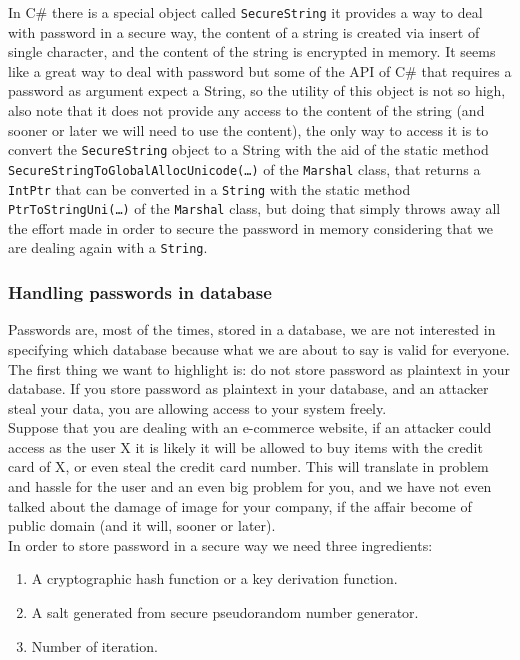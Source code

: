 In C\# there is a special object called \texttt{SecureString} it provides a way to deal with password in a secure way, the content of a string is created via insert of single character, and the content of the string is encrypted in memory.\newline
It seems like a great way to deal with password but some of the API of C\# that requires a password as argument expect a String, so the utility of this object is not so high, also note that it does not provide any access to the content of the string (and sooner or later we will need to use the content), the only way to access it is to convert the \texttt{SecureString} object to a String with the aid of the static method \texttt{SecureStringToGlobalAllocUnicode(…)} of the \texttt{Marshal} class, that returns a \texttt{IntPtr} that can be converted in a \texttt{String} with the static method \texttt{PtrToStringUni(…)} of the \texttt{Marshal} class, but doing that simply throws away all the effort made in order to secure the password in memory considering that we are dealing again with a \texttt{String}.\newline

\subsubsection{Handling passwords in database}
Passwords are, most of the times, stored in a database, we are not interested in specifying which database because what we are about to say is valid for everyone.\newline
The first thing we want to highlight is: do not store password as plaintext in your database.\newline
If you store password as plaintext in your database, and an attacker steal your data, you are allowing access to your system freely.\\

Suppose that you are dealing with an e-commerce website, if an attacker could access as the user X it is likely it will be allowed to buy items with the credit card of X, or even steal the credit card number.
This will translate in problem and hassle for the user and an even big problem for you, and we have not even talked about the damage of image for your company, if the affair become of public domain (and it will, sooner or later).\\
In order to store password in a secure way we need three ingredients:
\begin{enumerate}
	\item A cryptographic hash function or a key derivation function.
	\item A salt generated from secure pseudorandom number generator.
	\item Number of iteration.
\end{enumerate}

